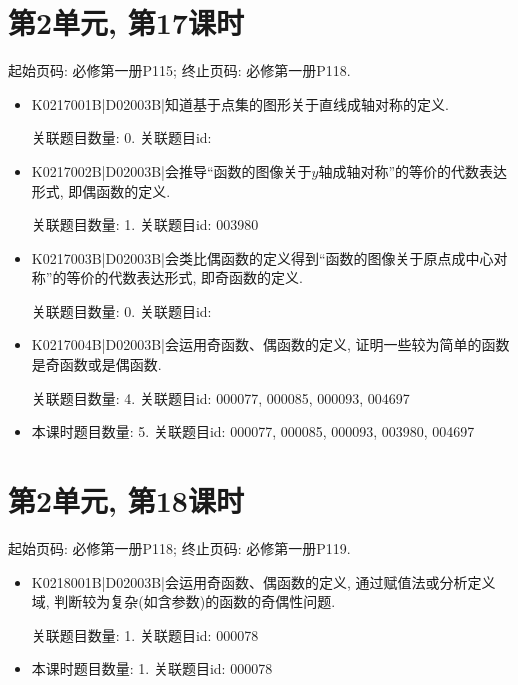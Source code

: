 \section*{第2单元, 第17课时}
起始页码: 必修第一册P115; 终止页码: 必修第一册P118.
\begin{itemize}
\item K0217001B|D02003B|知道基于点集的图形关于直线成轴对称的定义.

关联题目数量: 0. 关联题目id: 

\item K0217002B|D02003B|会推导``函数的图像关于$y$轴成轴对称''的等价的代数表达形式, 即偶函数的定义.

关联题目数量: 1. 关联题目id: 003980

\item K0217003B|D02003B|会类比偶函数的定义得到``函数的图像关于原点成中心对称''的等价的代数表达形式, 即奇函数的定义.

关联题目数量: 0. 关联题目id: 

\item K0217004B|D02003B|会运用奇函数、偶函数的定义, 证明一些较为简单的函数是奇函数或是偶函数.

关联题目数量: 4. 关联题目id: 000077, 000085, 000093, 004697

\item 本课时题目数量: 5. 关联题目id: 000077, 000085, 000093, 003980, 004697

\end{itemize}

\section*{第2单元, 第18课时}
起始页码: 必修第一册P118; 终止页码: 必修第一册P119.
\begin{itemize}
\item K0218001B|D02003B|会运用奇函数、偶函数的定义, 通过赋值法或分析定义域, 判断较为复杂(如含参数)的函数的奇偶性问题.

关联题目数量: 1. 关联题目id: 000078

\item 本课时题目数量: 1. 关联题目id: 000078

\end{itemize}

